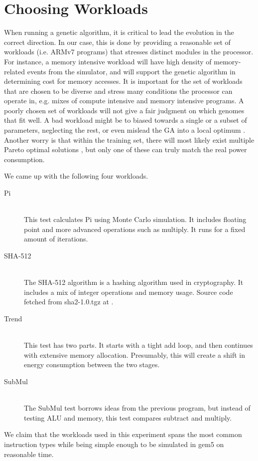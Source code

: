 \section{Choosing Workloads}
\label{sec:workloads}

When running a genetic algorithm, it is critical to lead the evolution in the
correct direction. In our case, this is done by providing a reasonable set of
workloads (i.e. ARMv7 programs) that stresses distinct modules in the processor.
For instance, a memory intensive workload will have high density of
memory-related events from the simulator, and will support the genetic algorithm
in determining cost for memory accesses. It is important for the set of
workloads that are chosen to be diverse and stress many conditions the processor
can operate in, e.g. mixes of compute intensive and memory intensive programs. A
poorly chosen set of workloads will not give a fair judgment on which genomes
that fit well. A bad workload might be to biased towards a single or a subset of
parameters, neglecting the rest, or even mislead the GA into a local optimum
\cite{introtoga}. Another worry is that within the training set, there will most
likely exist multiple Pareto optimal solutions \cite{deb2014multi}, but only one
of these can truly match the real power consumption.

We came up with the following four workloads.

\begin{description}
    \item[Pi] \hfill \\
        This test calculates Pi using Monte Carlo simulation. It includes
        floating point and more advanced operations such as multiply. It runs
        for a fixed amount of iterations.
    \item[SHA-512] \hfill \\
        The SHA-512 algorithm is a hashing algorithm used in cryptography. It
        includes a mix of integer operations and memory usage. Source code
        fetched from sha2-1.0.tgz at \cite{sha2}.
    \item[Trend] \hfill \\
        This test has two parts. It starts with a tight add loop, and then
        continues with extensive memory allocation. Presumably, this will create
        a shift in energy consumption between the two stages.
    \item[SubMul] \hfill \\
        The SubMul test borrows ideas from the previous program, but instead of
        testing ALU and memory, this test compares subtract and multiply.
\end{description}

We claim that the workloads used in this experiment spans the most common
instruction types while being simple enough to be simulated in gem5 on
reasonable time.

